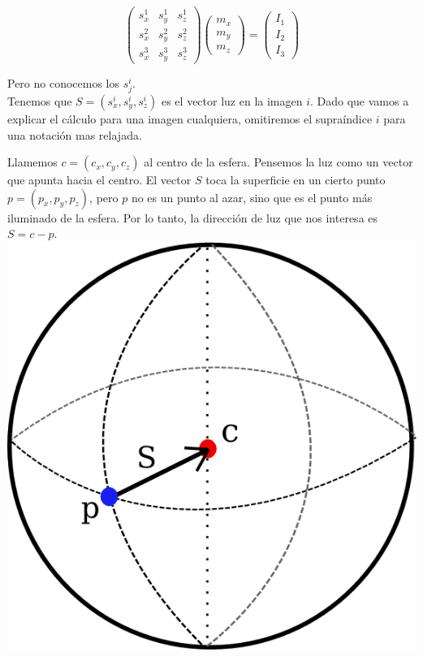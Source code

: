 \[
\begin{pmatrix}
    s_{x}^{1} & s_{y}^{1} & s_{z}^{1} \\
    s_{x}^{2} & s_{y}^{2} & s_{z}^{2} \\
    s_{x}^{3} & s_{y}^{3} & s_{z}^{3}
\end{pmatrix}
\begin{pmatrix}
    m_{x} \\
    m_{y} \\
    m_{z}
\end{pmatrix}
=
\begin{pmatrix}
    I_{1} \\
    I_{2} \\
    I_{3}
\end{pmatrix}
\]

Pero no conocemos los $s_{j}^{i}$. \\

Tenemos que $S = (s_{x}^{i}, s_{y}^{i}, s_{z}^{i})$ es el vector luz en la imagen $i$. Dado que vamos a explicar el cálculo para una imagen cualquiera, omitiremos el supraíndice $i$ para una notación mas relajada.

Llamemos $c = (c_{x}, c_{y}, c_{z})$ al centro de la esfera. Pensemos la luz como un vector que apunta hacia el centro. El vector $S$ toca la superficie en un cierto punto $p = (p_{x}, p_{y}, p_{z})$, pero $p$ no es un punto al azar, sino que es el punto más iluminado de la esfera. Por lo tanto, la dirección de luz que nos interesa es $S =  c - p$.\\

{\centering
    \includegraphics[scale=0.9]{informe/imagenes/esfera/esferaModelo.png} \\
}

